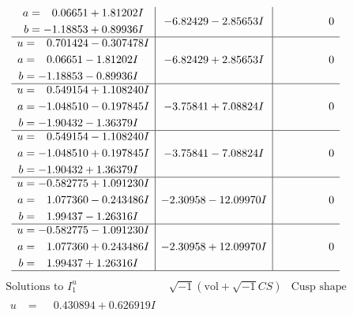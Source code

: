 \documentclass[1p]{elsarticle_modified}
\theoremstyle{definition}
\newcommand{\I}{\sqrt{-1}}
\begin{document}
$$\begin{array}{c|c|c}
\begin{aligned}
a &= \phantom{-}0.06651 + 1.81202 I \\
b &= -1.18853 + 0.89936 I\end{aligned}
 & -6.82429 - 2.85653 I & \phantom{-0.000000 } 0 \\ \hline\begin{aligned}
u &= \phantom{-}0.701424 - 0.307478 I \\
a &= \phantom{-}0.06651 - 1.81202 I \\
b &= -1.18853 - 0.89936 I\end{aligned}
 & -6.82429 + 2.85653 I & \phantom{-0.000000 } 0 \\ \hline\begin{aligned}
u &= \phantom{-}0.549154 + 1.108240 I \\
a &= -1.048510 - 0.197845 I \\
b &= -1.90432 - 1.36379 I\end{aligned}
 & -3.75841 + 7.08824 I & \phantom{-0.000000 } 0 \\ \hline\begin{aligned}
u &= \phantom{-}0.549154 - 1.108240 I \\
a &= -1.048510 + 0.197845 I \\
b &= -1.90432 + 1.36379 I\end{aligned}
 & -3.75841 - 7.08824 I & \phantom{-0.000000 } 0 \\ \hline\begin{aligned}
u &= -0.582775 + 1.091230 I \\
a &= \phantom{-}1.077360 - 0.243486 I \\
b &= \phantom{-}1.99437 - 1.26316 I\end{aligned}
 & -2.30958 - 12.09970 I & \phantom{-0.000000 } 0 \\ \hline\begin{aligned}
u &= -0.582775 - 1.091230 I \\
a &= \phantom{-}1.077360 + 0.243486 I \\
b &= \phantom{-}1.99437 + 1.26316 I\end{aligned}
 & -2.30958 + 12.09970 I & \phantom{-0.000000 } 0\\
 \hline 
 \end{array}$$\newpage$$\begin{array}{c|c|c}  
\text{Solutions to }I^u_{1}& \I (\text{vol} + \sqrt{-1}CS) & \text{Cusp shape}\\
 \hline 
\begin{aligned}
u &= \phantom{-}0.430894 + 0.626919 I \\

\end{aligned}
\end{array}$$
\end{document}
